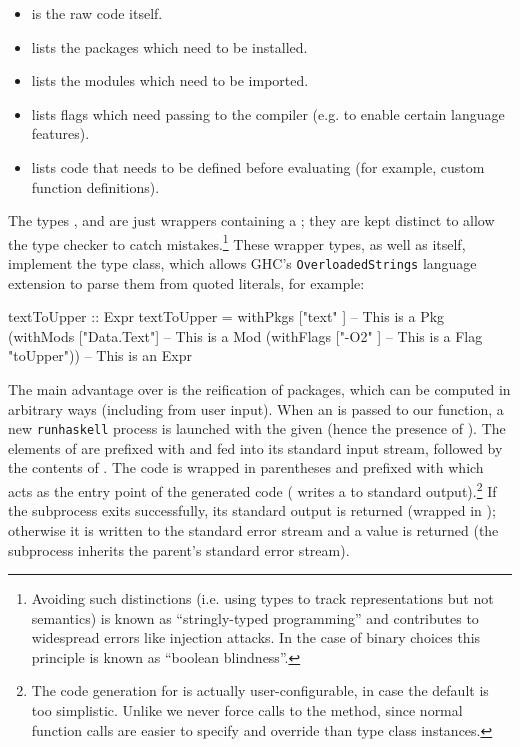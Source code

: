 \begin{itemize}
\item {} is the raw code itself.
\item {} lists the packages which need to be installed.
\item {} lists the modules which need to be imported.
\item {} lists flags which need passing to the compiler (e.g.
  to enable certain language features).
\item {} lists code that needs to be defined before
  evaluating (for example, custom function definitions).
\end{itemize}

The types ,  and  are just wrappers containing a
; they are kept distinct to allow the type checker to catch
mistakes.\footnote{Avoiding such distinctions (i.e. using types to track
  representations but not semantics) is known as ``stringly-typed programming''
  and contributes to widespread errors like injection attacks. In the case of
  binary choices this principle is known as ``boolean blindness''.} These
wrapper types, as well as  itself, implement the  type
class, which allows GHC's \texttt{OverloadedStrings} language extension to parse
them from quoted literals, for example:

\begin{haskell}
textToUpper :: Expr
textToUpper = withPkgs       ["text"     ]  -- This is a  Pkg
                (withMods    ["Data.Text"]  -- This is a  Mod
                  (withFlags ["-O2"      ]  -- This is a  Flag
                    "toUpper"))             -- This is an Expr
\end{haskell}

The main advantage over \hint is the reification of packages, which can be
computed in arbitrary ways (including from user input). When an  is
passed to our  function, a new \texttt{runhaskell} process is launched
with the given  (hence the presence of ). The elements of
 are prefixed with  and fed into its standard input
stream, followed by the contents of . The  code is
wrapped in parentheses and prefixed with  which acts
as the entry point of the generated code ( writes a
 to standard output).\footnote{The code generation for  is
  actually user-configurable, in case the default is too simplistic. Unlike
  \hint we never force calls to the  method, since normal function
  calls are easier to specify and override than type class instances.} If the
subprocess exits successfully, its standard output is returned (wrapped in
); otherwise it is written to the standard error stream and a
 value is returned (the subprocess inherits the parent's standard
error stream).

